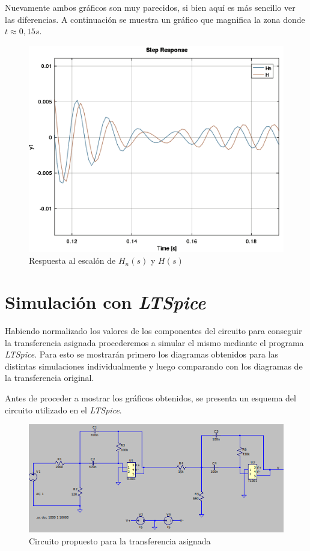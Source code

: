 \documentclass[11pt,a4paper]{report}
\begin{document}
Nuevamente ambos gráficos son muy parecidos, si bien aquí es más sencillo ver las
diferencias. A continuación se muestra un gráfico que magnifica la zona donde $t \approx 0,15s$.

\begin{figure}[h!]
\centering
\includegraphics[scale=0.48]{RtaEscalonCloseComp.png}
\caption{Respuesta al escalón de $H_{n}(s)$ y $H(s)$}
\end{figure}

\section*{Simulación con \textit{LTSpice}}

Habiendo normalizado los valores de los componentes del circuito para conseguir la
transferencia asignada procederemos a simular el mismo mediante el programa \textit{LTSpice}. Para esto se mostrarán primero los diagramas obtenidos para las
distintas simulaciones individualmente y luego comparando con los diagramas de la transferencia original.

\bigskip
Antes de proceder a mostrar los gráficos obtenidos, se presenta un esquema del circuito utilizado en el \textit{LTSpice}.

\vspace{20 mm}

\begin{figure}[h!]
\centering
\includegraphics[scale=1]{Circuito.png}
\caption{Circuito propuesto para la transferencia asignada}
\end{figure}
\end{document}
